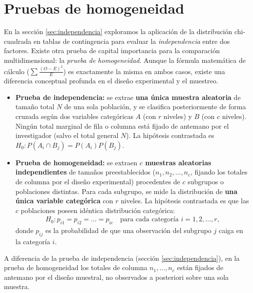 \section{Pruebas de homogeneidad}

En la sección \ref{sec:independencia} exploramos la aplicación de la distribución chi-cuadrada en tablas de contingencia para evaluar la \emph{independencia} entre dos factores. Existe otra prueba de capital importancia para la comparación multidimensional: la \emph{prueba de homogeneidad}. Aunque la fórmula matemática de cálculo ($\sum \frac{(O-E)^2}{E}$) es exactamente la misma en ambos casos, existe una diferencia conceptual profunda en el diseño experimental y el muestreo.

\begin{definicion}
	\begin{itemize}
		\item \textbf{Prueba de independencia:} se extrae \textbf{una única muestra aleatoria} de tamaño total $N$ de una sola población, y se clasifica posteriormente de forma cruzada según dos variables categóricas $A$ (con $r$ niveles) y $B$ (con $c$ niveles). Ningún total marginal de fila o columna está fijado de antemano por el investigador (salvo el total general $N$). La hipótesis contrastada es $H_0: P(A_i \cap B_j) = P(A_i)P(B_j)$.
		\item \textbf{Prueba de homogeneidad:} se extraen \textbf{$c$ muestras aleatorias independientes} de tamaños preestablecidos ($n_1, n_2, \ldots, n_c$, fijando los totales de columna por el diseño experimental) procedentes de $c$ subgrupos o poblaciones distintas. Para cada subgrupo, se mide la distribución de \textbf{una única variable categórica} con $r$ niveles. La hipótesis contrastada es que las $c$ poblaciones poseen idéntica distribución categórica:
		\begin{align}
			H_0: p_{i1} = p_{i2} = \ldots = p_{ic} \quad \text{para cada categoría } i = 1, 2, \ldots, r,
		\end{align}
		donde $p_{ij}$ es la probabilidad de que una observación del subgrupo $j$ caiga en la categoría $i$.
	\end{itemize}
	A diferencia de la prueba de independencia (sección \ref{sec:independencia}), en la prueba de homogeneidad los totales de columna $n_1, \ldots, n_c$ están fijados de antemano por el diseño muestral, no observados a posteriori sobre una sola muestra.
\end{definicion}

